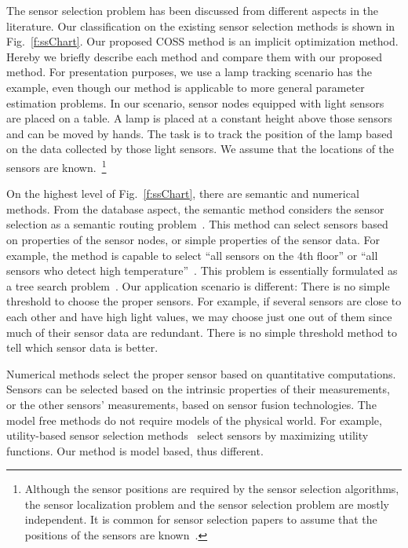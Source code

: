 The sensor selection problem has been discussed from different aspects in the literature. Our classification on the existing sensor selection methods is shown in Fig.~\ref{f:ssChart}. Our proposed COSS method is an implicit optimization method. Hereby we briefly describe each method and compare them with our proposed method. For presentation purposes, we use a lamp tracking scenario has the example, even though our method is applicable to more general parameter estimation problems. In our scenario, sensor nodes equipped with light sensors are placed on a table. A lamp is placed at a constant height above those sensors and can be moved by hands. The task is to track the position of the lamp based on the data collected by those light sensors. We assume that the locations of the sensors are known.~\footnote{Although the sensor positions are required by the sensor selection algorithms, the sensor localization problem and the sensor selection problem are mostly independent. It is common for sensor selection papers to assume that the positions of the sensors are known~\cite{isler06tase,SAM2006Amit,FZhaoShinInfoDrivenDynamicTracking,UcinskiPatanDoptSensorSelection06}.}


On the highest level of Fig.~\ref{f:ssChart}, there are semantic and numerical methods. From the database aspect, the semantic method considers the sensor selection as a semantic routing problem~\cite{GehrkeQueryProc2004,madden02design}. This method can select sensors based on properties of the sensor nodes, or simple properties of the sensor data. For example, the method is capable to select ``all sensors on the 4th floor'' or ``all sensors who detect high temperature''~\cite{GehrkeQueryProc2004}. This problem is essentially formulated as a tree search problem~\cite{madden02design}. Our application scenario is different: There is no simple threshold to choose the proper sensors. For example, if several sensors are close to each other and have high light values, we may choose just one out of them since much of their sensor data are redundant. There is no simple threshold method to tell which sensor data is better.


Numerical methods select the proper sensor based on quantitative computations. Sensors can be selected based on the intrinsic properties of their measurements, or the other sensors' measurements, based on sensor fusion technologies.
    The model free methods do not require models of the physical world. For example, utility-based sensor selection methods~\cite{byersUtilSS,utility-based-sensor-selection} select sensors by maximizing utility functions. Our method is model based, thus different.


